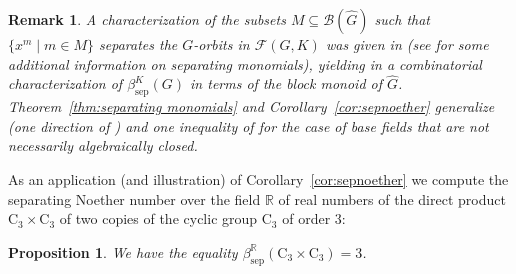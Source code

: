 \documentclass[12pt, oneside]{amsart}
\newtheorem{proposition}[theorem]{\bf Proposition}
\newtheorem{remark}[theorem]{\bf Remark}
\def\field{K}
\def\RR{\mathbb{R}}
\def\sepbeta{\beta_{\mathrm{sep}}}
\begin{document}
\begin{remark} 
A characterization of the subsets $M\subseteq \mathcal{B}(\widehat G)$ such that 
$\{x^m\mid m\in M\}$ separates the $G$-orbits in $\mathcal{F}(G,\field)$ was given in 
\cite[Theorem 2.1]{domokos:abelian} (see \cite[Proposition 3.2]{cahill-contreras-hip} for some additional information on 
separating monomials), yielding in \cite[Corollary 2.6]{domokos:abelian} a combinatorial characterization of $\sepbeta^\field(G)$ in terms of the block monoid of 
$\widehat G$.  Theorem~\ref{thm:separating monomials}  and Corollary~\ref{cor:sepnoether} generalize \cite[Proposition 2.3]{domokos:abelian} 
(one direction of \cite[Theorem 2.1]{domokos:abelian}) and one inequality of \cite[Corollary 2.6]{domokos:abelian} 
for the case of base fields that are not necessarily algebraically closed.  
\end{remark} 

As an application (and illustration) of Corollary~\ref{cor:sepnoether} we compute the 
separating Noether number over the field $\RR$ of real numbers of the 
direct product $\mathrm{C}_3\times\mathrm{C}_3$ of two copies of the cyclic group $\mathrm{C}_3$ 
of order $3$:  

\begin{proposition}\label{prop:C3xC3} 
We have the equality $\sepbeta^\RR(\mathrm{C}_3\times\mathrm{C}_3)=3$. 
\end{proposition} 
\end{document}
